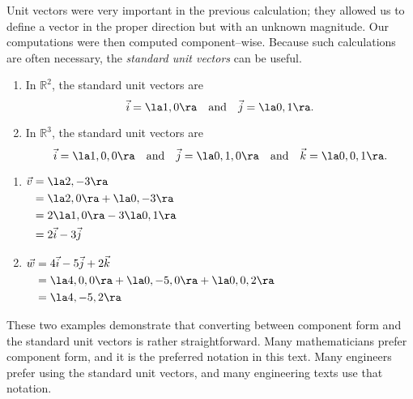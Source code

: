Unit vectors were very important in the previous calculation; they allowed us to define a vector in the proper direction but with an unknown magnitude. Our computations were then computed component--wise. Because such calculations are often necessary, the \textit{standard unit vectors} can be useful.

{\begin{enumerate}
	\item In $\mathbb{R}^2$, the standard unit vectors are
	\[
	\vec i = \la 1,0\ra \quad \text{and}\quad \vec j = \la 0,1\ra.
	\]
	\item In $\mathbb{R}^3$, the standard unit vectors are
	\[
	\vec i = \la 1,0,0\ra \quad \text{and}\quad \vec j = \la 0,1,0\ra \quad \text{and}\quad \vec k = \la 0,0,1\ra.
	\]
\end{enumerate}
}

{\begin{enumerate}
	\item  \hfill$\displaystyle \begin{aligned}[t]
					\vec v &= \la 2,-3\ra \\
								&= \la 2,0\ra + \la 0,-3\ra \\
								&= 2\la 1,0\ra -3\la 0,1\ra\\
								&= 2\vec i - 3\vec j
				\end{aligned}$\hfill\null
	
	\item	\hfill $\displaystyle \begin{aligned}[t]
				\vec w &= 4\vec i - 5\vec j +2\vec k\\
							&= \la 4,0,0\ra +\la 0,-5,0\ra + \la 0,0,2\ra \\
							&= \la 4,-5,2\ra
							\end{aligned}$\hfill\null
\end{enumerate}
These two examples demonstrate that converting between component form and the standard unit vectors is rather straightforward. Many mathematicians prefer component form, and it is the preferred notation in this text. Many engineers prefer using the standard unit vectors, and many engineering texts use that notation.
}\\

